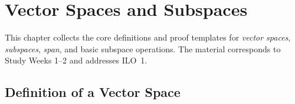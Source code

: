 
\section{Vector Spaces and Subspaces}

\label{sec:vector-spaces}


This chapter collects the core definitions and proof templates for \emph{vector spaces}, \emph{subspaces}, \emph{span}, and basic subspace operations. The material corresponds to Study Weeks 1--2 and addresses ILO~1.


\subsection{Definition of a Vector Space}


